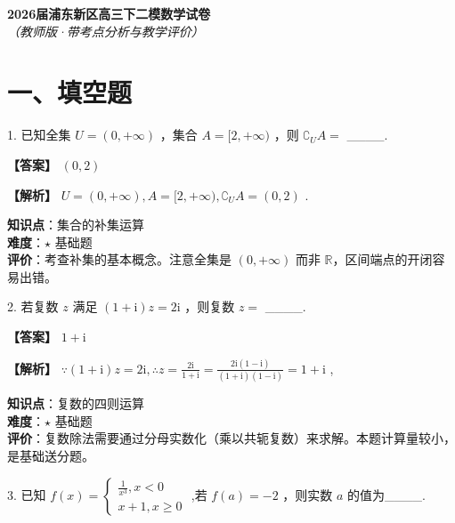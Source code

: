 \documentclass[10pt]{article}
\begin{document}
\begin{center}
\Large\textbf{2026届浦东新区高三下二模数学试卷}\\[0.5em]
\normalsize\textit{（教师版·带考点分析与教学评价）}
\end{center}

\section*{一、填空题}

1. 已知全集 \(U = \left( {0, + \infty }\right)\) ，集合 \(A = \lbrack 2, + \infty )\) ，则 \({\complement }_{U}A =\) \_\_\_\_.

\textbf{【答案】} \(\left( {0,2}\right)\)

\textbf{【解析】} \(U = \left( {0, + \infty }\right) ,A = \lbrack 2, + \infty ),{\complement }_{U}A = \left( {0,2}\right)\) .

\begin{analysisbox}[考点分析]
\textbf{知识点}：集合的补集运算\\
\textbf{难度}：\(\star\) 基础题\\
\textbf{评价}：考查补集的基本概念。注意全集是 \((0, +\infty)\) 而非 \(\mathbb{R}\)，区间端点的开闭容易出错。
\end{analysisbox}

2. 若复数 \(z\) 满足 \(\left( {1 + \mathrm{i}}\right) z = {2\mathrm{i}}\) ，则复数 \(z =\) \_\_\_\_.

\textbf{【答案】} \(1 + \mathrm{i}\)

\textbf{【解析】} \(\because \left( {1 + \mathrm{i}}\right) z = 2\mathrm{i},\therefore z = \frac{2\mathrm{i}}{1 + \mathrm{i}} = \frac{2\mathrm{i}\left( {1 - \mathrm{i}}\right) }{\left( {1 + \mathrm{i}}\right) \left( {1 - \mathrm{i}}\right) } = 1 + \mathrm{i}\) ,

\begin{analysisbox}[考点分析]
\textbf{知识点}：复数的四则运算\\
\textbf{难度}：\(\star\) 基础题\\
\textbf{评价}：复数除法需要通过分母实数化（乘以共轭复数）来求解。本题计算量较小，是基础送分题。
\end{analysisbox}

3. 已知 \(f\left( x\right)  = \left\{  \begin{array}{l} \frac{1}{{x}^{3}},x < 0 \\  x + 1,x \geq  0 \end{array}\right.\) ,若 \(f\left( a\right)  =  - 2\) ，则实数 \(a\) 的值为\_\_\_\_.
\end{document}
